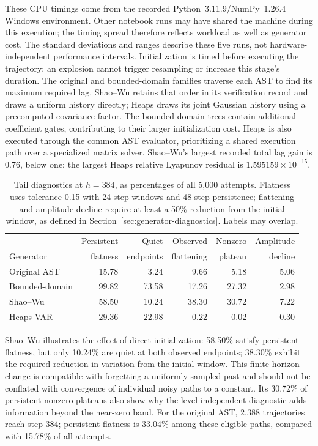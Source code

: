 These CPU timings come from the recorded Python~3.11.9/NumPy~1.26.4 Windows
environment. Other notebook runs may have shared the machine during this execution;
the timing spread therefore reflects workload as well as generator cost.
The standard deviations and ranges describe these five runs, not
hardware-independent performance intervals. Initialization
is timed before executing the trajectory; an explosion cannot trigger
resampling or increase this stage's duration. The original and bounded-domain
families traverse each AST to find its maximum required lag. Shao--Wu retains
that order in its verification record and draws a uniform history directly;
Heaps draws its joint Gaussian history using a precomputed covariance factor.
The bounded-domain trees contain additional coefficient gates, contributing
to their larger initialization cost. Heaps is also executed through the
common AST evaluator, prioritizing a shared execution path over a specialized
matrix solver. Shao--Wu's largest recorded total lag gain is 0.76, below one;
the largest Heaps relative Lyapunov residual is
$1.595159\times10^{-15}$.

\begin{table}[H]
\centering\small
\begin{tabular}{@{}lrrrrr@{}}
\toprule
& Persistent & Quiet & Observed & Nonzero & Amplitude \\
Generator & flatness & endpoints & flattening & plateau & decline \\
\midrule
Original AST & 15.78 & 3.24 & 9.66 & 5.18 & 5.06 \\
Bounded-domain & 99.82 & 73.58 & 17.26 & 27.32 & 2.98 \\
Shao--Wu & 58.50 & 10.24 & 38.30 & 30.72 & 7.22 \\
Heaps VAR & 29.36 & 22.98 & 0.22 & 0.02 & 0.30 \\
\bottomrule
\end{tabular}
\caption{Tail diagnostics at $h=384$, as percentages of all 5,000 attempts.
Flatness uses tolerance 0.15 with 24-step windows and 48-step persistence;
flattening and amplitude decline require at least a 50\% reduction from the
initial window, as defined in Section~\ref{sec:generator-diagnostics}.
Labels may overlap.}
\label{tab:generator-tail-outcomes}
\end{table}

Shao--Wu illustrates the effect of direct initialization: 58.50\% satisfy
persistent flatness, but only 10.24\% are quiet at both observed endpoints;
38.30\% exhibit the required reduction in variation from the initial window.
This finite-horizon change is compatible with forgetting a uniformly sampled
past and should not be conflated with convergence of individual noisy paths
to a constant. Its 30.72\% of persistent nonzero plateaus also show why the
level-independent diagnostic adds information beyond the near-zero band.
For the original AST,
2,388 trajectories reach step 384; persistent flatness is 33.04\% among these
eligible paths, compared with 15.78\% of all attempts.


